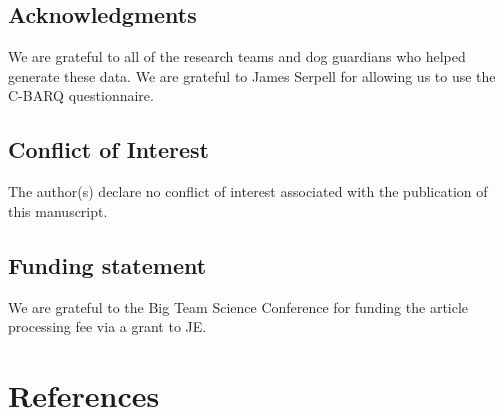 \documentclass[
  pub,floatsintext]{apa6}
\begin{document}
\hypertarget{acknowledgments}{%
\subsection{Acknowledgments}\label{acknowledgments}}

We are grateful to all of the research teams and dog guardians who helped generate these data. We are grateful to James Serpell for allowing us to use the C-BARQ questionnaire.

\hypertarget{conflict-of-interest}{%
\subsection{Conflict of Interest}\label{conflict-of-interest}}

The author(s) declare no conflict of interest associated with the publication of this manuscript.

\hypertarget{funding-statement}{%
\subsection{Funding statement}\label{funding-statement}}

We are grateful to the Big Team Science Conference for funding the article processing fee via a grant to JE.

\hypertarget{references}{%
\section{References}\label{references}}

\scriptsize
\end{document}
